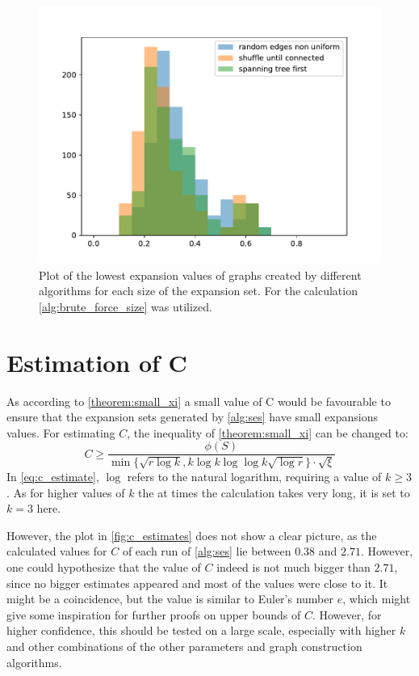 \begin{figure}
	\centering
	\includegraphics[scale=1]{figures/creation_algorithm_log_lowest_expansion.pdf}
	\caption[Plot lowest expansion for different algorithms]{Plot of the lowest expansion values of graphs created by different algorithms for each size of the expansion set. For the calculation \cref{alg:brute_force_size} was utilized.\label{fig:plot_lowest_expansion_each_size}}
\end{figure}

\section{Estimation of C}
As according to \cref{theorem:small_xi} a small value of C would be favourable to ensure that the expansion sets generated by \cref{alg:ses} have small expansions values. 
For estimating $C$, the inequality of \cref{theorem:small_xi} can be changed to:
\begin{equation} \label{eq:c_estimate}
C\ge \frac {\phi(S)}{ \min\{\sqrt{r \log k}, k \log k  \log \log k \sqrt{\log r} \} \cdot \sqrt{\xi}}
\end{equation} In \cref{eq:c_estimate}, $\log$ refers to the natural logarithm, requiring a value of $k\ge3$. As for higher values of $k$ the at times the calculation takes very long, it is set to $k=3$ here.


However, the plot in \cref{fig:c_estimates} does not show a clear picture, as the calculated values for $ C$ of each run of \cref{alg:ses} lie between $0.38$ and $2.71$. However, one could hypothesize that the value of $C$ indeed is not much bigger than $2.71$, since no bigger estimates appeared and most of the values were close to it. It might be a coincidence, but the value is similar to Euler's number $e$, which might give some inspiration for further proofs on upper bounds of $C$. 
However, for higher confidence, this should be tested on a large scale, especially with higher $k$ and other combinations of the other parameters and graph construction algorithms.


